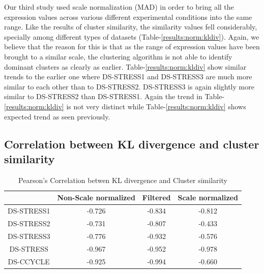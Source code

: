 Our third study used scale normalization (MAD) in order to bring all the expression values across various different experimental conditions into the same range. Like the results of cluster similarity, the similarity values fell considerably, specially among different types of datasets (Table-\ref{results:norm:kldiv}). Again, we believe that the reason for this is that as the range of expression values have been brought to a similar scale, the clustering algorithm is not able to identify dominant clusters as clearly as earlier. Table-\ref{results:norm:kldiv} show similar trends to the earlier one where DS-STRESS1 and DS-STRESS3 are much more similar to each other than to DS-STRESS2. DS-STRESS3 is again slightly more similar to DS-STRESS2 than DS-STRESS1. Again the trend in Table-\ref{results:norm:kldiv} is not very distinct while  Table-\ref{results:norm:kldiv} shows expected trend as seen previously.

\subsection{Correlation between KL divergence and cluster similarity}

\begin{table}[t]
\centering
\begin{tabular}{|c|c|c|c|}
\hline
& Non-Scale normalized & Filtered & Scale normalized \\
\hline

DS-STRESS1 & -0.726	& -0.834  & -0.812 \\ \hline
DS-STRESS2 & -0.731	& -0.807  & -0.433 \\ \hline
DS-STRESS3 & -0.776     & -0.932  & -0.576 \\ \hline
DS-STRESS  & -0.967     & -0.952  & -0.978 \\ \hline
DS-CCYCLE & -0.925  & -0.994  & -0.660 \\ \hline
\end{tabular}
\caption{Pearson's Correlation betwen KL divergence and Cluster similarity}
\label{results:correlation_clustering_kldivergence}
\end {table}

